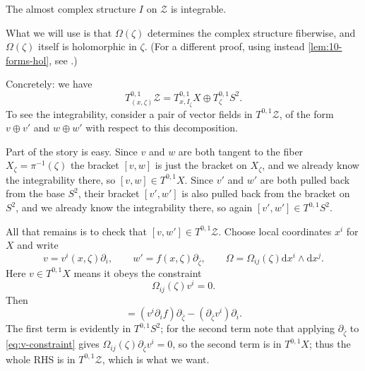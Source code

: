 \documentclass[12pt,letterpaper,reqno]{article}
\numberwithin{equation}{section}
\newcommand{\cZ}{\ensuremath{\mathcal Z}}
\newcommand{\de}{\mathrm{d}}
\begin{document}
\begin{prop} The almost complex structure $I$ on $\cZ$ is integrable.
\end{prop}
\begin{pf}
What we will use is that $\Omega(\zeta)$ determines the complex structure fiberwise,
and $\Omega(\zeta)$ itself is holomorphic in $\zeta$.
(For a different proof, using instead \autoref{lem:10-forms-hol},
see \cite{Hitchin:1986ea}.)

Concretely: we have
\begin{equation}
T^{0,1}_{(x,\zeta)} \cZ = T^{0,1}_{x,I_\zeta} X \oplus T^{0,1}_\zeta S^2.
\end{equation}
To see the integrability, consider a pair of vector fields in $T^{0,1} \cZ$,
of the form $v \oplus v'$
and $w \oplus w'$ with respect to this decomposition.

Part of the story is easy.
Since $v$ and $w$ are both tangent to the fiber $X_{\zeta} = \pi^{-1}(\zeta)$
the bracket $[v,w]$ is just the bracket on $X_{\zeta}$, and we already
know the integrability there, so $[v,w] \in T^{0,1} X$.
Since $v'$ and $w'$ are both pulled back from the base $S^2$,
their bracket $[v',w']$ is also pulled back from the bracket on $S^2$,
and we already know the integrability there, so again $[v',w'] \in T^{0,1} S^2$.

All that remains is to check
that $[v,w'] \in T^{0,1} \cZ$.
Choose local coordinates $x^i$ for $X$ and write
\begin{equation}
v = v^i(x,\zeta) \partial_i, \qquad w' = f(x,\zeta) \partial_{\bar \zeta}, \qquad
\Omega = \Omega_{ij}(\zeta) \de x^i \wedge \de x^j.
\end{equation}
Here $v \in T^{0,1} X$ means it obeys the constraint
\begin{equation} \label{eq:v-constraint}
\Omega_{ij}(\zeta) v^i = 0.
\end{equation}
Then
\begin{equation}
 [v, f \partial_{\bar \zeta}] = (v^i \partial_i f) \partial_{\bar \zeta} - (\partial_{\bar \zeta} v^i) \partial_i.
\end{equation}
The first term is evidently in $T^{0,1} S^2$; for the second term note that
applying $\partial_{\bar \zeta}$ to \eqref{eq:v-constraint}
gives $\Omega_{ij}(\zeta) \partial_{\bar \zeta} v^i = 0$,
so the second term is in $T^{0,1} X$; thus the whole RHS is
in $T^{0,1} \cZ$, which is what we want.
\end{pf}
\end{document}
